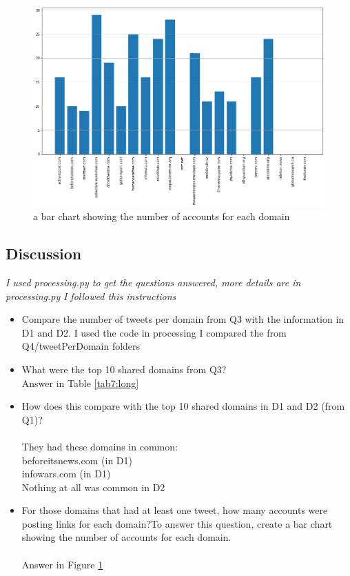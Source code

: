 \documentclass[12pt]{article}
\begin{document}
\begin{figure}[H]
            \centering
            \includegraphics[trim=0 0 0 0, clip, width=\textwidth] {barchar4.png}
            \caption{ a bar chart showing the number of accounts for each domain}
            \label{fig:Q4Ans}
        \end{figure}
\subsection*{Discussion}
\emph{I used processing.py to get the questions answered, more details are in processing.py}
\emph{I followed this instructions}
    \begin{itemize}
        \item Compare the number of tweets per domain from Q3 with the information in D1 and D2. I used the code in processing  
        I compared the  from Q4/tweetPerDomain folders
        \item What were the top 10 shared domains from Q3? \\ Answer in Table \ref{tab7:long}
        \item How does this compare with the top 10 shared domains in D1 and D2 (from Q1)?  \\ \\ They had these domains in common: \\
        beforeitsnews.com  (in D1) \\
        infowars.com  (in D1)   \\
        Nothing at all was common in D2
         \item For those domains that had at least one tweet, how many accounts were posting links for each domain?To answer this question, create a bar chart showing the number of accounts for each domain.
        \\ \\ Answer in Figure \ref{fig:Q4Ans}
    \end{itemize}
\end{document}
